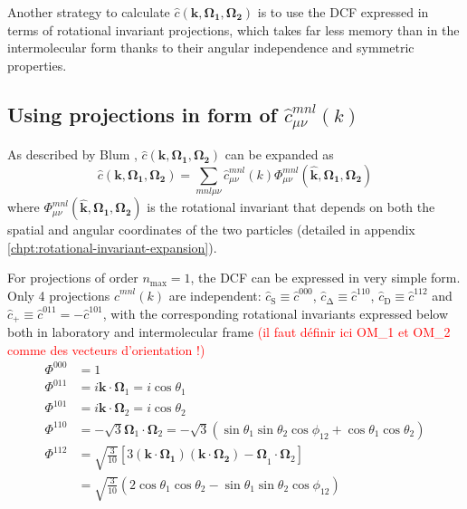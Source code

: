 Another strategy to calculate $\hat{c}(\mathbf{k},\mathbf{\Omega_{1}},\mathbf{\Omega_{2}})$
is to use the DCF expressed in terms of rotational invariant projections,
which takes far less memory than in the intermolecular form thanks
to their angular independence and symmetric properties. 


\subsection{Using projections in form of $\hat{c}_{\mu\nu}^{mnl}(k)$\label{sub:Using-projections-in}}

As described by Blum \citep{Blum_I,Blum_II}, $\hat{c}(\mathbf{k},\mathbf{\Omega_{1}},\mathbf{\Omega_{2}})$
can be expanded as
\begin{equation}
\hat{c}(\mathbf{k},\mathbf{\Omega_{1}},\mathbf{\Omega_{2}})=\sum_{mnl\mu\nu}\hat{c}_{\mu\nu}^{mnl}(k)\Phi_{\mu\nu}^{mnl}(\mathbf{\hat{k}},\mathbf{\Omega_{1}},\mathbf{\Omega_{2}})
\end{equation}
where $\Phi_{\mu\nu}^{mnl}(\mathbf{\hat{k}},\mathbf{\Omega_{1}},\mathbf{\Omega_{2}})$
is the rotational invariant that depends on both the spatial and angular
coordinates of the two particles (detailed in appendix \ref{chpt:rotational-invariant-expansion}).

For projections of order $n{}_{\mathrm{max}}=1$, the DCF can be expressed
in very simple form. Only 4 projections $\hat{c}^{mnl}(k)$ are independent:
$\hat{c}_{\mathrm{S}}\equiv\hat{c}^{000}$, $\hat{c}_{\mathrm{\Delta}}\equiv\hat{c}^{110}$,
$\hat{c}_{\mathrm{D}}\equiv\hat{c}^{112}$ and $\hat{c}_{+}\equiv\hat{c}^{011}=-\hat{c}^{101}$,
with the corresponding rotational invariants expressed below both
in laboratory and intermolecular frame \textcolor{red}{(il faut définir
ici OM\_1 et OM\_2 comme des vecteurs d'orientation !)}
\begin{align}
\Phi^{000} & =1\nonumber \\
\Phi^{011} & =i\mathbf{k}\cdot\mathbf{\Omega}_{1}=i\cos\theta_{1}\nonumber \\
\Phi^{101} & =i\mathbf{k}\cdot\mathbf{\Omega}_{2}=i\cos\theta_{2}\nonumber \\
\Phi^{110} & =-\sqrt{3}\mathbf{\Omega}_{1}\cdot\mathbf{\Omega}_{2}=-\sqrt{3}(\sin\theta_{1}\sin\theta_{2}\cos\phi_{12}+\cos\theta_{1}\cos\theta_{2})\nonumber \\
\Phi^{112} & =\sqrt{\frac{3}{10}}\left[3\mathbf{(\mathbf{k}\cdot\mathbf{\Omega}_{1})(\mathbf{k}\cdot\mathbf{\Omega}_{2})-\Omega}_{1}\cdot\mathbf{\Omega}_{2}\right]\\
 & =\sqrt{\frac{3}{10}}\left(2\cos\theta_{1}\cos\theta_{2}-\sin\theta_{1}\sin\theta_{2}\cos\phi_{12}\right)\nonumber 
\end{align}


